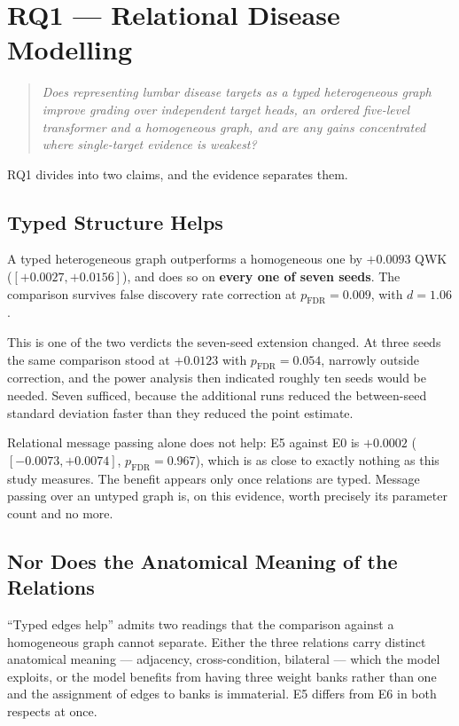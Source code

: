 \documentclass[12pt,a4paper]{report}
\begin{document}
\section{RQ1 --- Relational Disease Modelling}
\label{sec:results-rq1}

\begin{quote}
\emph{Does representing lumbar disease targets as a typed heterogeneous graph
improve grading over independent target heads, an ordered five-level transformer
and a homogeneous graph, and are any gains concentrated where single-target
evidence is weakest?}
\end{quote}

RQ1 divides into two claims, and the evidence separates them.

\subsection{Typed Structure Helps}

A typed heterogeneous graph outperforms a homogeneous one by $+0.0093$ QWK
($[+0.0027, +0.0156]$), and does so on \textbf{every one of seven seeds}. The
comparison survives false discovery rate correction at
$p_{\mathrm{FDR}} = 0.009$, with $d = 1.06$.

This is one of the two verdicts the seven-seed extension changed. At three seeds
the same comparison stood at $+0.0123$ with $p_{\mathrm{FDR}} = 0.054$, narrowly
outside correction, and the power analysis then indicated roughly ten seeds would
be needed. Seven sufficed, because the additional runs reduced the between-seed
standard deviation faster than they reduced the point estimate.

Relational message passing alone does not help: E5 against E0 is $+0.0002$
($[-0.0073, +0.0074]$, $p_{\mathrm{FDR}} = 0.967$), which is as close to exactly
nothing as this study measures. The benefit appears only once relations are
typed. Message passing over an untyped graph is, on this evidence, worth
precisely its parameter count and no more.

\subsection{Nor Does the Anatomical Meaning of the Relations}
\label{sec:results-rq1-typeshuf}

\enquote{Typed edges help} admits two readings that the comparison against a
homogeneous graph cannot separate. Either the three relations carry distinct
anatomical meaning --- adjacency, cross-condition, bilateral --- which the model
exploits, or the model benefits from having three weight banks rather than one
and the assignment of edges to banks is immaterial. E5 differs from E6 in both
respects at once.
\end{document}
